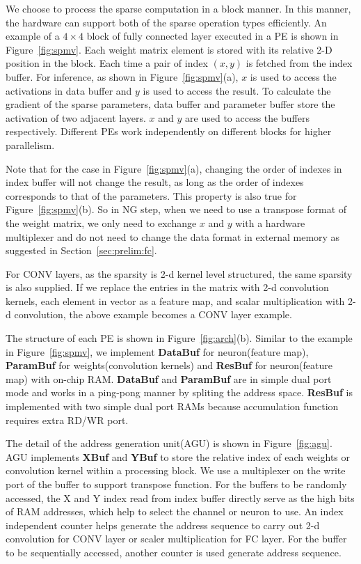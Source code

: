 We choose to process the sparse computation in a block manner. In this manner, the hardware can support both of the sparse operation types efficiently. An example of a $4\times 4$ block of fully connected layer executed in a PE is shown in Figure~\ref{fig:spmv}. Each weight matrix element is stored with its relative 2-D position in the block. Each time a pair of index $(x, y)$ is fetched from the index buffer. For inference, as shown in Figure~\ref{fig:spmv}(a), $x$ is used to access the activations in data buffer and $y$ is used to access the result. To calculate the gradient of the sparse parameters, data buffer and parameter buffer store the activation of two adjacent layers. $x$ and $y$ are used to access the buffers respectively. Different PEs work independently on different blocks for higher parallelism.

Note that for the case in Figure~\ref{fig:spmv}(a), changing the order of indexes in index buffer will not change the result, as long as the order of indexes corresponds to that of the parameters. This property is also true for Figure~\ref{fig:spmv}(b). So in NG step, when we need to use a transpose format of the weight matrix, we only need to exchange $x$ and $y$ with a hardware multiplexer and do not need to change the data format in external memory as suggested in Section~\ref{sec:prelim:fc}. 

For CONV layers, as the sparsity is 2-d kernel level structured, the same sparsity is also supplied. If we replace the entries in the matrix with 2-d convolution kernels, each element in vector as a feature map, and scalar multiplication with 2-d convolution, the above example becomes a CONV layer example.

The structure of each PE is shown in Figure~\ref{fig:arch}(b). Similar to the example in Figure~\ref{fig:spmv}, we implement {\bf{DataBuf}} for neuron(feature map), {\bf{ParamBuf}} for weights(convolution kernels) and {\bf{ResBuf}} for neuron(feature map) with on-chip RAM. {\bf{DataBuf}} and {\bf{ParamBuf}} are in simple dual port mode and works in a ping-pong manner by spliting the address space. {\bf{ResBuf}} is implemented with two simple dual port RAMs because accumulation function requires extra RD/WR port.

The detail of the address generation unit(AGU) is shown in Figure~\ref{fig:agu}. AGU implements {\bf{XBuf}} and {\bf{YBuf}} to store the relative index of each weights or convolution kernel within a processing block. We use a multiplexer on the write port of the buffer to support transpose function. For the buffers to be randomly accessed, the X and Y index read from index buffer directly serve as the high bits of RAM addresses, which help to select the channel or neuron to use. An index independent counter helps generate the address sequence to carry out 2-d convolution for CONV layer or scaler multiplication for FC layer. For the buffer to be sequentially accessed, another counter is used generate address sequence.

